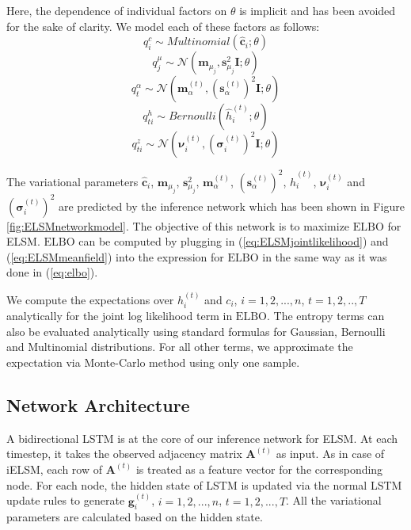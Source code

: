 \documentclass[letterpaper]{article} %
\begin{document}
Here, the dependence of individual factors on $\theta$ is implicit and has been avoided for the sake of clarity. We model each of these factors as follows:
\begin{equation}
	\label{eq:c_factor}
	q_i^c \sim Multinomial(\mathbf{\hat{c}}_i; \theta)
\end{equation}
\begin{equation}
	\label{eq:mu_factor}
	q_j^\mu \sim \mathcal{N}(\mathbf{m}_{\mu_j}, \mathbf{s}_{\mu_j}^2 \mathbf{I}; \theta)
\end{equation}
\begin{equation}
	\label{eq:alpha_factor}
	q_t^\alpha \sim \mathcal{N}(\mathbf{m}^{(t)}_{\alpha}, (\mathbf{s}^{(t)}_{\alpha})^2 \mathbf{I}; \theta)
\end{equation}
\begin{equation}
	\label{eq:h_factor}
	q_{ti}^h \sim Bernoulli(\hat{h}^{(t)}_{i}; \theta)
\end{equation}
\begin{equation}
	\label{eq:z_factor}
	q_{ti}^z \sim \mathcal{N}(\bm{\nu}_i^{(t)}, (\bm{\sigma}_i^{(t)})^2\mathbf{I}; \theta)
\end{equation}

The variational parameters $\mathbf{\hat{c}}_i$, $\mathbf{m}_{\mu_j}$, $\mathbf{s}_{\mu_j}^2$, $\mathbf{m}^{(t)}_{\alpha}$, $(\mathbf{s}^{(t)}_{\alpha})^2$, $\hat{h}^{(t)}_{i}$, $\bm{\nu}_i^{(t)}$ and $(\bm{\sigma}_i^{(t)})^2$ are predicted by the inference network which has been shown in Figure \ref{fig:ELSMnetworkmodel}. The objective of this network is to maximize $\mathrm{ELBO}$ for ELSM. $\mathrm{ELBO}$ can be computed by plugging in (\ref{eq:ELSMjointlikelihood}) and (\ref{eq:ELSMmeanfield}) into the expression for $\mathrm{ELBO}$ in the same way as it was done in (\ref{eq:elbo}).

We compute the expectations over ${h_i^{(t)}}$ and ${c_i}$, ${i} = 1, 2, ..., {n}$, ${t} = 1, 2, .., {T}$ analytically for the joint log likelihood term in $\mathrm{ELBO}$. The entropy terms can also be evaluated analytically using standard formulas for Gaussian, Bernoulli and Multinomial distributions. For all other terms, we approximate the expectation via Monte-Carlo method using only one sample.


\subsection{Network Architecture}
\label{appendix:ELSMnetworkarchitecture}
A bidirectional LSTM is at the core of our inference network for ELSM. At each timestep, it takes the observed adjacency matrix $\mathbf{A}^{(t)}$ as input. As in case of iELSM, each row of $\mathbf{A}^{(t)}$ is treated as a feature vector for the corresponding node. For each node, the hidden state of LSTM is updated via the normal LSTM update rules to generate $\mathbf{g}_i^{(t)}$, $i = 1, 2, ..., {n}$, $t = 1, 2, ..., {T}$. All the variational parameters are calculated based on the hidden state.
\end{document}
